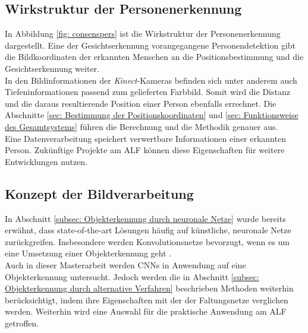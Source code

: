 	\subsection{Wirkstruktur der Personenerkennung}
	\label{subsec: Wirkstrukur Personenerkennung}
	In Abbildung \ref{fig: consenspers} ist die Wirkstruktur der Personenerkennung dargestellt. Eine der Gesichtserkennung vorangegangene Personendetektion gibt die Bildkoordinaten der erkannten Menschen an die Positionsbestimmung und die Gesichtserkennung weiter.\\
	
	In den Bildinformationen der \textit{Kinect}-Kameras befinden sich unter anderem auch Tiefeninformationen passend zum gelieferten Farbbild. Somit wird die Distanz und die daraus resultierende Position einer Person ebenfalls errechnet. Die Abschnitte \ref{sec: Bestimmung der Positionskoordinaten} und \ref{sec: Funktionsweise des Gesamtsystems} führen die Berechnung und die Methodik genauer aus.\\
		
	
	

		
	Eine Datenverarbeitung speichert verwertbare Informationen einer erkannten Person. Zukünftige Projekte am ALF können diese Eigenschaften für weitere Entwicklungen nutzen.\\   
		
	\subsection{Konzept der Bildverarbeitung}
	\label{subsec: Auswahl und Training der verwendeten neuronalen Netze}
		
	In Abschnitt \ref{subsec: Objekterkennung durch neuronale Netze} wurde bereits erwähnt, dass state-of-the-art Lösungen häufig auf künstliche, neuronale Netze zurückgreifen. Insbesondere werden Konvolutionsnetze bevorzugt, wenn es um eine Umsetzung einer Objekterkennung geht \cite{bildundobjekt}.\\
	
	Auch in dieser Masterarbeit werden CNNs in Anwendung auf eine Objekterkennung untersucht. Jedoch werden die in Abschnitt \ref{subsec: Objekterkennung durch alternative Verfahren} beschrieben Methoden weiterhin berücksichtigt, indem ihre Eigenschaften mit der der Faltungsnetze verglichen werden. Weiterhin wird eine Auswahl für die praktische Anwendung am ALF getroffen. \\
		
